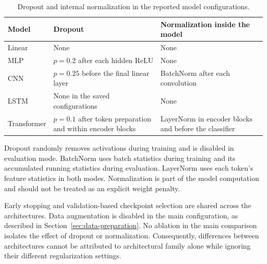 \begin{table}[H]
    \centering
    \caption{Dropout and internal normalization in the reported model configurations.}
    \label{tab:a1-regularization}
    \begin{tabularx}{\textwidth}{@{}lYY@{}}
        \toprule
        Model & Dropout & Normalization inside the model \\
        \midrule
        Linear & None & None \\
        MLP & $p=0.2$ after each hidden ReLU & None \\
        CNN & $p=0.25$ before the final linear layer & BatchNorm after each convolution \\
        LSTM & None in the saved configurations & None \\
        Transformer & $p=0.1$ after token preparation and within encoder blocks & LayerNorm in encoder blocks and before the classifier \\
        \bottomrule
    \end{tabularx}
\end{table}

Dropout randomly removes activations during training and is disabled in evaluation mode. BatchNorm uses batch statistics during training and its accumulated running statistics during evaluation. LayerNorm uses each token's feature statistics in both modes. Normalization is part of the model computation and should not be treated as an explicit weight penalty.

Early stopping and validation-based checkpoint selection are shared across the architectures. Data augmentation is disabled in the main configuration, as described in Section~\ref{sec:data-preparation}. No ablation in the main comparison isolates the effect of dropout or normalization. Consequently, differences between architectures cannot be attributed to architectural family alone while ignoring their different regularization settings.
